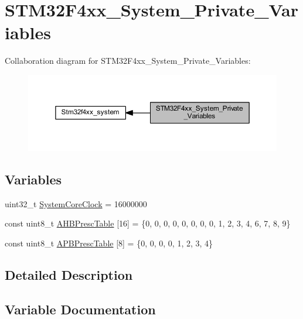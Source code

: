 \hypertarget{group___s_t_m32_f4xx___system___private___variables}{}\section{S\+T\+M32\+F4xx\+\_\+\+System\+\_\+\+Private\+\_\+\+Variables}
\label{group___s_t_m32_f4xx___system___private___variables}
Collaboration diagram for S\+T\+M32\+F4xx\+\_\+\+System\+\_\+\+Private\+\_\+\+Variables\+:
\nopagebreak
\begin{figure}[H]
\begin{center}
\leavevmode
\includegraphics[width=350pt]{group___s_t_m32_f4xx___system___private___variables}
\end{center}
\end{figure}
\subsection*{Variables}
\begin{DoxyCompactItemize}
\item 
uint32\+\_\+t \mbox{\hyperlink{group___s_t_m32_f4xx___system___private___variables_gaa3cd3e43291e81e795d642b79b6088e6}{System\+Core\+Clock}} = 16000000
\item 
const uint8\+\_\+t \mbox{\hyperlink{group___s_t_m32_f4xx___system___private___variables_ga6e1d9cd666f0eacbfde31e9932a93466}{A\+H\+B\+Presc\+Table}} \mbox{[}16\mbox{]} = \{0, 0, 0, 0, 0, 0, 0, 0, 1, 2, 3, 4, 6, 7, 8, 9\}
\item 
const uint8\+\_\+t \mbox{\hyperlink{group___s_t_m32_f4xx___system___private___variables_ga5b4f8b768465842cf854a8f993b375e9}{A\+P\+B\+Presc\+Table}} \mbox{[}8\mbox{]} = \{0, 0, 0, 0, 1, 2, 3, 4\}
\end{DoxyCompactItemize}


\subsection{Detailed Description}


\subsection{Variable Documentation}
\mbox{\label{group___s_t_m32_f4xx___system___private___variables_ga6e1d9cd666f0eacbfde31e9932a93466}} 
